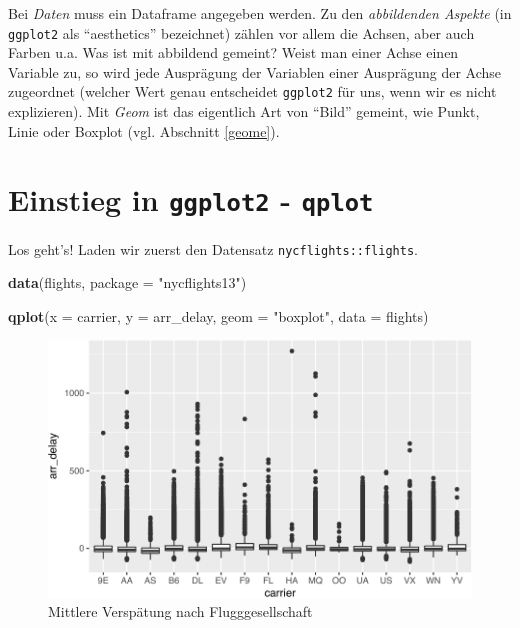 \documentclass[12pt,ngerman,]{book}
\newenvironment{Shaded}{\begin{snugshade}}{\end{snugshade}}
\newcommand{\KeywordTok}[1]{\textcolor[rgb]{0.13,0.29,0.53}{\textbf{{#1}}}}
\newcommand{\DataTypeTok}[1]{\textcolor[rgb]{0.13,0.29,0.53}{{#1}}}
\newcommand{\StringTok}[1]{\textcolor[rgb]{0.31,0.60,0.02}{{#1}}}
\newcommand{\NormalTok}[1]{{#1}}
\renewenvironment{Shaded}{\begin{kframe}}{\end{kframe}}
\begin{document}
Bei \emph{Daten} muss ein Dataframe angegeben werden. Zu den
\emph{abbildenden Aspekte} (in \texttt{ggplot2} als ``aesthetics''
bezeichnet) zählen vor allem die Achsen, aber auch Farben u.a. Was ist
mit abbildend gemeint? Weist man einer Achse einen Variable zu, so wird
jede Ausprägung der Variablen einer Ausprägung der Achse zugeordnet
(welcher Wert genau entscheidet \texttt{ggplot2} für uns, wenn wir es
nicht explizieren). Mit \emph{Geom} ist das eigentlich Art von ``Bild''
gemeint, wie Punkt, Linie oder Boxplot (vgl. Abschnitt \ref{geome}).

\section{\texorpdfstring{Einstieg in \texttt{ggplot2} -
\texttt{qplot}}{Einstieg in ggplot2 - qplot}}\label{einstieg-in-ggplot2---qplot}

Los geht's! Laden wir zuerst den Datensatz \texttt{nycflights::flights}.

\begin{Shaded}
\begin{Highlighting}[]
\KeywordTok{data}\NormalTok{(flights, }\DataTypeTok{package =} \StringTok{"nycflights13"}\NormalTok{)}
\end{Highlighting}
\end{Shaded}

\begin{Shaded}
\begin{Highlighting}[]
\KeywordTok{qplot}\NormalTok{(}\DataTypeTok{x =} \NormalTok{carrier, }\DataTypeTok{y =} \NormalTok{arr_delay, }\DataTypeTok{geom =} \StringTok{"boxplot"}\NormalTok{, }\DataTypeTok{data =} \NormalTok{flights)}
\end{Highlighting}
\end{Shaded}

\begin{figure}

{\centering \includegraphics[width=0.7\linewidth]{050_Daten_visualisieren_files/figure-latex/fig-flights-1} 

}

\caption{Mittlere Verspätung nach Flugggesellschaft}\label{fig:fig-flights}
\end{figure}
\end{document}
